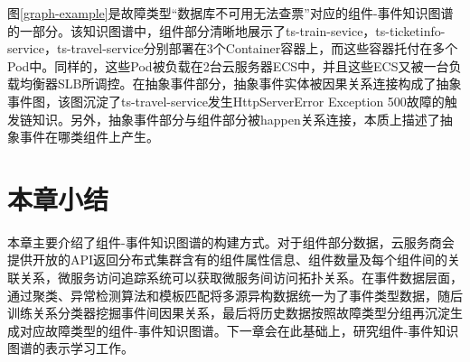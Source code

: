 图\ref{graph-example}是故障类型“数据库不可用无法查票”对应的组件-事件知识图谱的一部分。该知识图谱中，组件部分清晰地展示了ts-train-sevice，ts-ticketinfo-service，ts-travel-service分别部署在3个Container容器上，而这些容器托付在多个Pod中。同样的，这些Pod被负载在2台云服务器ECS中，并且这些ECS又被一台负载均衡器SLB所调控。在抽象事件部分，抽象事件实体被因果关系连接构成了抽象事件图，该图沉淀了ts-travel-service发生HttpServerError Exception 500故障的触发链知识。另外，抽象事件部分与组件部分被happen关系连接，本质上描述了抽象事件在哪类组件上产生。

\section{本章小结}
本章主要介绍了组件-事件知识图谱的构建方式。对于组件部分数据，云服务商会提供开放的API返回分布式集群含有的组件属性信息、组件数量及每个组件间的关联关系，微服务访问追踪系统可以获取微服务间访问拓扑关系。在事件数据层面，通过聚类、异常检测算法和模板匹配将多源异构数据统一为了事件类型数据，随后训练关系分类器挖掘事件间因果关系，最后将历史数据按照故障类型分组再沉淀生成对应故障类型的组件-事件知识图谱。下一章会在此基础上，研究组件-事件知识图谱的表示学习工作。


